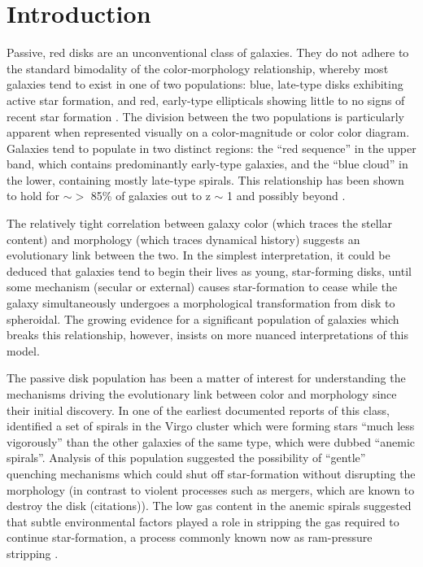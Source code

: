 \documentclass[useAMS,usenatbib]{mn2e}
\begin{document}
\section{Introduction}
\label{sec:Intro}

Passive, red disks are an unconventional class of galaxies. They do not adhere to the standard bimodality of the color-morphology relationship, whereby most galaxies tend to exist in one of two populations: blue, late-type disks exhibiting active star formation, and red, early-type ellipticals showing little to no signs of recent star formation \citep{Strateva2001, Baldry2004, Correa2017}. The division between the two populations is particularly apparent when represented visually on a color-magnitude or color color diagram. Galaxies tend to populate in two distinct regions: the ``red sequence'' in the upper band, which contains predominantly early-type galaxies, and the ``blue cloud'' in the lower, containing mostly late-type spirals. This relationship has been shown to hold for $\sim >$ 85\% of galaxies out to z $\sim$ 1 \citep{Bell2004,Cirasuolo2007,Mignoli2009} and possibly beyond \citep{Giallongo2005, vanDokkum2006, Franzetti2007, Cassata2008}. 

The relatively tight correlation between galaxy color (which traces the stellar content) and morphology (which traces dynamical history) suggests an evolutionary link between the two. In the simplest interpretation, it could be deduced that galaxies tend to begin their lives as young, star-forming disks, until some mechanism (secular or external) causes star-formation to cease while the galaxy simultaneously undergoes a morphological transformation from disk to spheroidal. The growing evidence for a significant population of galaxies which breaks this relationship, however, insists on more nuanced interpretations of this model. 

The passive disk population has been a matter of interest for understanding the mechanisms driving the evolutionary link between color and morphology since their initial discovery.  In one of the earliest documented reports of this class, \citet{VandenBergh1976} identified a set of spirals in the Virgo cluster which were forming stars ``much less vigorously'' than the other galaxies of the same type, which were dubbed ``anemic spirals''. Analysis of this population suggested the possibility of ``gentle'' quenching mechanisms which could shut off star-formation without disrupting the morphology (in contrast to violent processes such as mergers, which are known to destroy the disk (citations)). The low gas content in the anemic spirals suggested that subtle environmental factors played a role in stripping the gas required to continue star-formation, a process commonly known now as ram-pressure stripping \citep{Gunn1972,Steinhauser2016}. 
\end{document}
